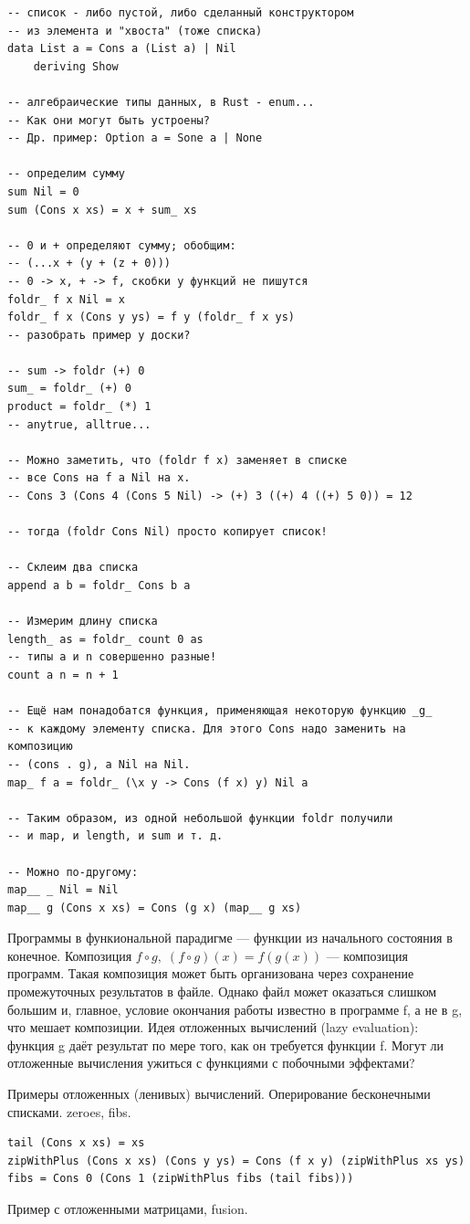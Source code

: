 \documentclass{book}
\begin{document}
\begin{verbatim}
-- список - либо пустой, либо сделанный конструктором
-- из элемента и "хвоста" (тоже списка)
data List a = Cons a (List a) | Nil
    deriving Show

-- алгебраические типы данных, в Rust - enum...
-- Как они могут быть устроены?
-- Др. пример: Option a = Sone a | None

-- определим сумму
sum Nil = 0
sum (Cons x xs) = x + sum_ xs

-- 0 и + определяют сумму; обобщим:
-- (...x + (y + (z + 0)))
-- 0 -> x, + -> f, скобки у функций не пишутся
foldr_ f x Nil = x
foldr_ f x (Cons y ys) = f y (foldr_ f x ys)
-- разобрать пример у доски?

-- sum -> foldr (+) 0
sum_ = foldr_ (+) 0
product = foldr_ (*) 1
-- anytrue, alltrue...

-- Можно заметить, что (foldr f x) заменяет в списке
-- все Cons на f а Nil на x.
-- Cons 3 (Cons 4 (Cons 5 Nil) -> (+) 3 ((+) 4 ((+) 5 0)) = 12

-- тогда (foldr Cons Nil) просто копирует список!

-- Склеим два списка
append a b = foldr_ Cons b a

-- Измерим длину списка
length_ as = foldr_ count 0 as
-- типы a и n совершенно разные!
count a n = n + 1

-- Ещё нам понадобатся функция, применяющая некоторую функцию _g_
-- к каждому элементу списка. Для этого Cons надо заменить на композицию
-- (cons . g), а Nil на Nil.
map_ f a = foldr_ (\x y -> Cons (f x) y) Nil a

-- Таким образом, из одной небольшой функции foldr получили
-- и map, и length, и sum и т. д.

-- Можно по-другому:
map__ _ Nil = Nil
map__ g (Cons x xs) = Cons (g x) (map__ g xs)
\end{verbatim}

Программы в функиональной парадигме --- функции из начального состояния в конечное. Композиция $f
\circ g, \; (f \circ g)(x) = f(g(x))$ --- композиция программ. Такая композиция может быть
организована через сохранение промежуточных результатов в файле. Однако файл может оказаться
слишком большим и, главное, условие окончания работы известно в программе f, а не в g, что мешает
композиции. Идея отложенных вычислений (lazy evaluation): функция g даёт результат по мере того,
как он требуется функции f. Могут ли отложенные вычисления ужиться с функциями с побочными
эффектами?

Примеры отложенных (ленивых) вычислений. Оперирование бесконечными списками. zeroes, fibs.
\begin{verbatim}
tail (Cons x xs) = xs
zipWithPlus (Cons x xs) (Cons y ys) = Cons (f x y) (zipWithPlus xs ys)
fibs = Cons 0 (Cons 1 (zipWithPlus fibs (tail fibs)))
\end{verbatim}
Пример с отложенными матрицами, fusion.
\end{document}
